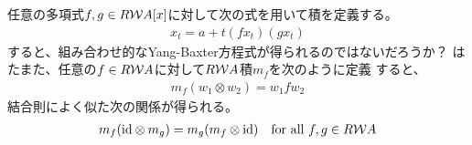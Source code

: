 {	\begin{note}\label{note:Yang-Baxterとの関連} %
		任意の多項式$f,g\in R{{\mathcal{W}}} A[x]$に対して次の式を用いて積を定義する。
		\begin{equation*}\begin{split}
			x_t = a + t(fx_t)(gx_t)
		\end{split}\end{equation*}
		すると、組み合わせ的なYang-Baxter方程式が得られるのではないだろうか？
		はたまた、任意の$f\in R{{\mathcal{W}}} A$に対して$R{{\mathcal{W}}} A$積$m_f$を次のように定義
		すると、
		\begin{equation*}\begin{split}
			m_f(w_1\otimes w_2) = w_1fw_2
		\end{split}\end{equation*}
		結合則によく似た次の関係が得られる。
		\begin{equation*}\begin{split}
			m_f({\operatorname{id}}\otimes m_g) = m_g(m_f\otimes{\ensuremath{\operatorname{id}}})
			\quad\text{for all } f,g\in R{{\mathcal{W}}} A
		\end{split}\end{equation*}
	\end{note} %

}
